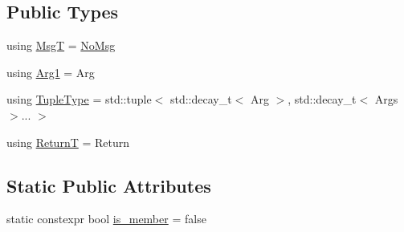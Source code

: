 \subsection*{Public Types}
\begin{DoxyCompactItemize}
\item 
using \hyperlink{structvt_1_1util_1_1fntraits_1_1detail_1_1_func_traits_impl_3_01std_1_1enable__if__t_3_01not_07s3fd5866f31025a6fa1e7500192630846_a2c8420778da985fde9ecbcc610fac156}{MsgT} = \hyperlink{structvt_1_1util_1_1fntraits_1_1detail_1_1_no_msg}{No\+Msg}
\item 
using \hyperlink{structvt_1_1util_1_1fntraits_1_1detail_1_1_func_traits_impl_3_01std_1_1enable__if__t_3_01not_07s3fd5866f31025a6fa1e7500192630846_a69f65a6edbf46974391f9f689992d6f4}{Arg1} = Arg
\item 
using \hyperlink{structvt_1_1util_1_1fntraits_1_1detail_1_1_func_traits_impl_3_01std_1_1enable__if__t_3_01not_07s3fd5866f31025a6fa1e7500192630846_aff63cb59848ab7b280d359b08b3e280e}{Tuple\+Type} = std\+::tuple$<$ std\+::decay\+\_\+t$<$ Arg $>$, std\+::decay\+\_\+t$<$ Args $>$... $>$
\item 
using \hyperlink{structvt_1_1util_1_1fntraits_1_1detail_1_1_func_traits_impl_3_01std_1_1enable__if__t_3_01not_07s3fd5866f31025a6fa1e7500192630846_a585043c274d89488f8092a8a8ab27d0a}{ReturnT} = Return
\end{DoxyCompactItemize}
\subsection*{Static Public Attributes}
\begin{DoxyCompactItemize}
\item 
static constexpr bool \hyperlink{structvt_1_1util_1_1fntraits_1_1detail_1_1_func_traits_impl_3_01std_1_1enable__if__t_3_01not_07s3fd5866f31025a6fa1e7500192630846_a92e9ba7d083b7dd9f2a1a000e5b1e9cb}{is\+\_\+member} = false
\end{DoxyCompactItemize}


